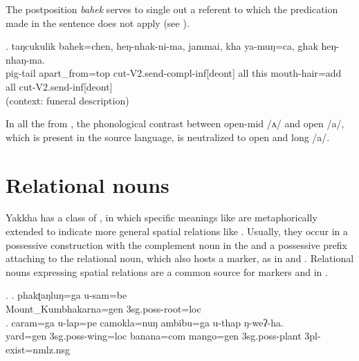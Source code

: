 The  postposition \emph{bahek}   serves to single out a referent to which the predication made in the sentence does not apply (see \Next). 

\exg. taŋcukulik bahek=chen, heŋ-nhak-ni-ma, jammai, kha  ya-muŋ=ca, ghak heŋ-nhaŋ-ma.\\
pig-tail apart\_from{\sc =top} cut{\sc -V2.send-compl-inf[deont]} all this mouth-hair{\sc =add} all cut{\sc -V2.send-inf[deont]}\\
 (context: funeral description) 


In all the  from , the phonological contrast between open-mid /ʌ/ and open /a/, which is present in the source language, is neutralized to open and long /a/.

 
\section{Relational nouns}\label{postpos-2}
  
  Yakkha has a class of , in which  specific meanings like  are metaphorically extended to indicate more general spatial relations like . Usually, they occur in a possessive construction with the complement noun in the  and a possessive prefix attaching to the relational noun, which also hosts a   marker, as in  \Next[a] and \Next[b]. Relational nouns expressing spatial relations are a common source for  markers and  in  \citep[62]{DeLancey1985_Etymological}.
  
	\ex. \ag. phakʈaŋluŋ=ga        u-sam=be\\
		Mount\_Kumbhakarna{\sc =gen} {\sc 3sg.poss-}root{\sc =loc}	\\
		  
		\bg. caram=ga    u-lap=pe    camokla=nuŋ   ambibu=ga    u-thap     ŋ-weʔ-ha.\\
		yard{\sc =gen} {\sc 3sg.poss-}wing{\sc =loc} banana{\sc =com} mango{\sc =gen} {\sc 3sg.poss-}plant {\sc 3pl-}exist{\sc [npst]=nmlz.nsg}\\
		 
	
